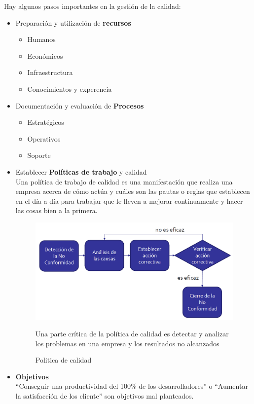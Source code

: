 Hay algunos pasos importantes en la gestión de la calidad:
\begin{itemize}
   \item Preparación y utilización de \textbf{recursos}
   \begin{itemize}
      \item Humanos
      \item Económicos
      \item Infraestructura
      \item Conocimientos y experencia
   \end{itemize}
   \item Documentación y evaluación de \textbf{Procesos}
   \begin{itemize}
      \item Estratégicos
      \item Operativos
      \item Soporte
   \end{itemize}
   \item Establecer \textbf{Políticas de trabajo} y calidad\\
   Una política de trabajo de calidad es una manifestación que realiza una empresa acerca de cómo actúa y cuáles son las pautas o reglas que establecen en el día a día para trabajar que le lleven a mejorar continuamente y hacer las cosas bien a la primera.

   \begin{figure}[htbp]
      \centering
      \includegraphics{images/01/politicaCalidad.png}
      \caption{Politica de calidad}
      \label{fig:01/politicaCalidad}
      Una parte crítica de la política de calidad es detectar y analizar los problemas en una empresa y los resultados no alcanzados
   \end{figure}
   \item \textbf{Objetivos}\\
   ``Conseguir una productividad del 100\% de los desarrolladores'' o ``Aumentar la satisfacción de los cliente'' son objetivos mal planteados.

\end{itemize}

